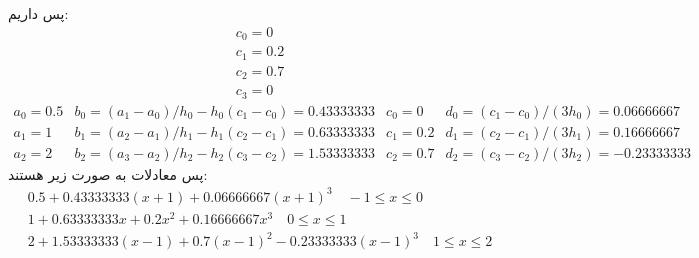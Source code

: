 \documentclass[]{article}
\begin{document}
پس داریم:
\begin{gather*}
    c_0 = 0\\
    c_1 = 0.2\\
    c_2 = 0.7\\
    c_3 = 0
\end{gather*}
\[
\begin{array}{cccc}
    a_0 = 0.5 & b_0 = (a_1 - a_0)/h_0 - h_0 (c_1-c_0) = 0.43333333 & c_0 = 0 & d_0 = (c_1 - c_0) / (3h_0) = 0.06666667\\
    a_1 = 1 & b_1 = (a_2 - a_1)/h_1 - h_1 (c_2-c_1) = 0.63333333 & c_1 = 0.2 & d_1 = (c_2 - c_1) / (3h_1) = 0.16666667\\
    a_2 = 2 & b_2 = (a_3 - a_2)/h_2 - h_2 (c_3-c_2) = 1.53333333 & c_2 = 0.7 & d_2 = (c_3 - c_2) / (3h_2) = -0.23333333
\end{array}
\]
پس معادلات به صورت زیر هستند:
\begin{gather*}
    0.5 + 0.43333333 (x + 1) + 0.06666667 (x + 1)^3 \quad -1 \le x \le 0\\
    1 + 0.63333333 x + 0.2x^2 + 0.16666667 x^3 \quad 0 \le x \le 1\\
    2 + 1.53333333 (x - 1) + 0.7 (x-1)^2 -0.23333333 (x - 1)^3 \quad 1 \le x \le 2
\end{gather*}
\end{document}
